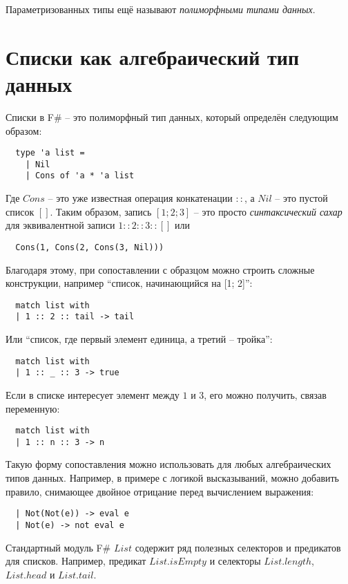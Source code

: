 \documentclass[a4paper,11pt]{article}
\begin{document}
Параметризованных типы ещё называют \emph{полиморфными типами данных}.
\section{Списки как алгебраический тип данных}
Списки в F\# -- это полиморфный тип данных, который определён следующим образом:
\begin{lstlisting}
  type 'a list = 
    | Nil
    | Cons of 'a * 'a list
\end{lstlisting}

Где $Cons$ -- это уже известная операция конкатенации $::$, а $Nil$ -- это 
пустой список $[]$. Таким образом, запись $[1; 2; 3]$ -- это просто 
\emph{синтаксический сахар} для эквивалентной записи $1 :: 2 :: 3 :: []$ или
\begin{lstlisting}
  Cons(1, Cons(2, Cons(3, Nil))) 
\end{lstlisting}

Благодаря этому, при сопоставлении с образцом можно строить сложные конструкции,
например ``список, начинающийся на [1; 2]'':
\begin{lstlisting}
  match list with
  | 1 :: 2 :: tail -> tail
\end{lstlisting}
Или ``список, где первый элемент единица, а третий -- тройка'':
\begin{lstlisting}
  match list with
  | 1 :: _ :: 3 -> true
\end{lstlisting}
Если в списке интересует элемент между $1$ и $3$, его можно получить, связав
переменную:
\begin{lstlisting}
  match list with
  | 1 :: n :: 3 -> n
\end{lstlisting}

Такую форму сопоставления можно использовать для любых алгебраических типов
данных. Например, в примере с логикой высказываний, можно добавить правило, 
снимающее двойное отрицание перед вычислением выражения:
\begin{lstlisting}
  | Not(Not(e)) -> eval e
  | Not(e) -> not eval e
\end{lstlisting}

Стандартный модуль F\# $List$ содержит ряд полезных селекторов и предикатов
для списков. Например, предикат $List.isEmpty$ и селекторы $List.length$,
$List.head$ и $List.tail$.
\end{document}
